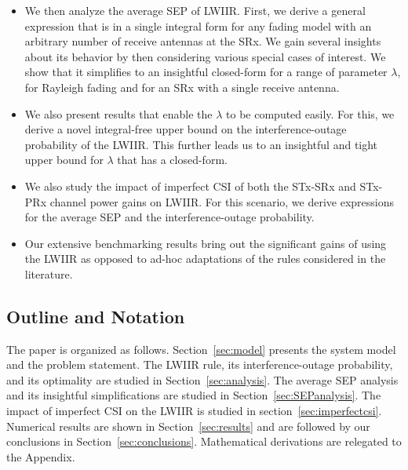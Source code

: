 \documentclass[12pt,draftcls,peerreview,onecolumn]{IEEEtran}
\newcommand{\lam}{\lambda}
\newcommand{\Nt}{{N_t}}
\begin{document}
\begin{itemize}
%
\item We then analyze the average SEP of LWIIR. First, we derive a general expression that is in a single integral form for any fading model with an arbitrary number of receive antennas at the SRx. We gain several insights about its behavior by then considering various special cases of interest. We show that it simplifies to an insightful closed-form for a range of parameter $\lam$, for Rayleigh fading and for an SRx with a single receive antenna.  
% 
\item We also present results that enable the $\lam$ to be computed easily. For this, we derive a novel integral-free upper bound on the interference-outage probability of the LWIIR. This further leads us to an insightful and tight upper bound for $\lam$ that has a closed-form.
% 
%

\item We also study the impact of imperfect CSI of both the STx-SRx and STx-PRx channel power gains on LWIIR. For this scenario, we derive  expressions for the average SEP and the interference-outage probability.

\item Our extensive benchmarking results bring out the significant gains of using the LWIIR as opposed to ad-hoc adaptations of the rules considered in the literature.

\end{itemize}

\subsection{Outline and Notation}
The  paper is organized as follows. Section~\ref{sec:model} presents the system model and the problem statement. The LWIIR rule, its interference-outage probability, and its optimality are studied in Section~\ref{sec:analysis}. The average SEP analysis and its insightful simplifications are studied in Section~\ref{sec:SEPanalysis}. The impact of imperfect CSI on the LWIIR  is studied in section~\ref{sec:imperfectcsi}. Numerical results are shown in Section~\ref{sec:results} and are followed by our conclusions in Section~\ref{sec:conclusions}. Mathematical derivations are relegated to the Appendix.
\end{document}
